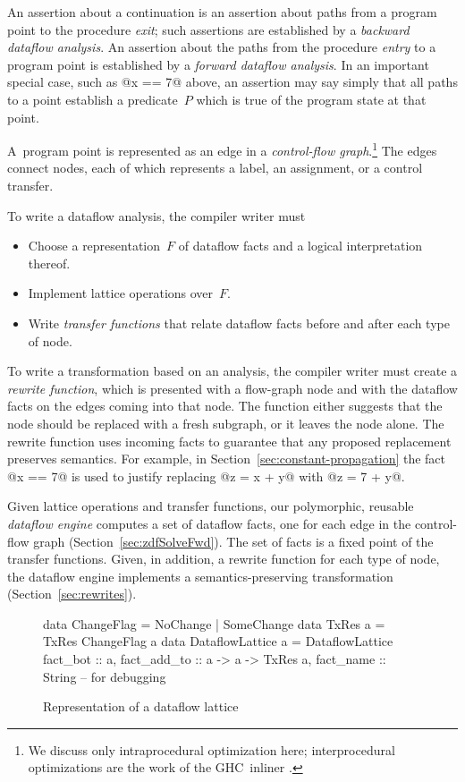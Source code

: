 \documentclass[blockstyle,preprint,nocopyrightspace]{sigplanconf}
\let\cite\citep
\newcommand\secref[1]{Section~\ref{sec:#1}}
\newcommand\figlabel[1]{\label{fig:#1}}
\begin{document}
An assertion about a continuation is an assertion about paths from a program point
to the procedure \emph{exit};
such assertions are established by a \emph{backward dataflow analysis}.
An assertion about the paths from the procedure
\emph{entry} to a program point is established by a \emph{forward dataflow analysis}.
In an important special case, such as @x == 7@ above,
an assertion may say simply
that all paths to a point establish a predicate~$P$ which is true of the program
state at that point. 

A~program point is represented as an edge in
a \emph{control-flow graph}.\footnote
{We discuss only intraprocedural optimization here;
interprocedural optimizations are the work of the GHC~inliner
\cite{peyton-jones:secrets-inliner}.} 
The edges connect nodes, each of which represents a label, an assignment, or
a control transfer.

To write a dataflow analysis, the compiler
writer must 
\begin{itemize}
\item
Choose a representation~$F$ of dataflow facts and a logical interpretation
thereof.
\item
Implement lattice operations over~$F$.
\item
Write \emph{transfer functions} that relate dataflow facts before and
after each type of node.
\end{itemize}

To write a transformation based on an analysis, the compiler writer
must create a \emph{rewrite function}, which is presented with a
flow-graph node and with the dataflow facts on the edges coming
into that node.
The function either suggests that the node should be replaced with a
fresh subgraph, or it leaves the node alone.
The rewrite function uses incoming facts to guarantee that
any proposed replacement preserves semantics.
For example, in \secref{constant-propagation} the fact @x == 7@ is
used to justify replacing @z = x + y@ with @z = 7 + y@.

Given lattice operations and transfer functions, our
polymorphic, reusable \emph{dataflow engine} computes a
set of dataflow facts, one for each edge in the control-flow graph 
(\secref{zdfSolveFwd}).
The set of facts is a fixed point of the transfer functions.
Given, in addition, a rewrite function for each type of node,
the dataflow engine implements a semantics-preserving transformation
(\secref{rewrites}). 

\begin{figure}
\begin{code}
data ChangeFlag = NoChange | SomeChange
data TxRes a    = TxRes ChangeFlag a
data DataflowLattice a = DataflowLattice
 {fact_bot        :: a,
  fact_add_to     :: a -> a -> TxRes a,
  fact_name       :: String } -- for debugging
\end{code}
\caption{Representation of a dataflow lattice} \figlabel{lattice-type} \figlabel{lattice}
\end{figure}
\end{document}
